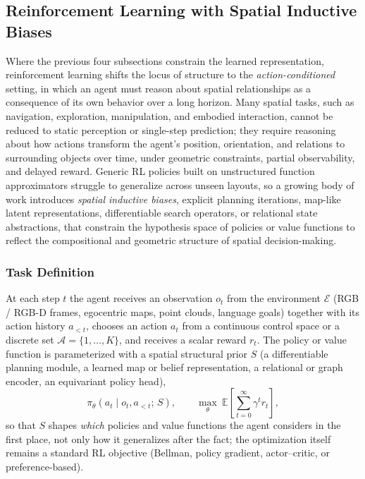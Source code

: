 \subsection{Reinforcement Learning with Spatial Inductive Biases}
\label{subsec:p3_s7_2_5}

Where the previous four subsections constrain the learned representation, reinforcement learning shifts the locus of structure to the \emph{action-conditioned} setting, in which an agent must reason about spatial relationships as a consequence of its own behavior over a long horizon.
Many spatial tasks, such as navigation, exploration, manipulation, and embodied interaction, cannot be reduced to static perception or single-step prediction; they require reasoning about how actions transform the agent's position, orientation, and relations to surrounding objects over time, under geometric constraints, partial observability, and delayed reward.
Generic RL policies built on unstructured function approximators struggle to generalize across unseen layouts, so a growing body of work introduces \emph{spatial inductive biases}, explicit planning iterations, map-like latent representations, differentiable search operators, or relational state abstractions, that constrain the hypothesis space of policies or value functions to reflect the compositional and geometric structure of spatial decision-making.


\subsubsection{Task Definition}
At each step $t$ the agent receives an observation $o_t$ from the environment $\mathcal{E}$ (RGB / RGB-D frames, egocentric maps, point clouds, language goals) together with its action history $a_{<t}$, chooses an action $a_t$ from a continuous control space or a discrete set $\mathcal{A}=\{1,\ldots,K\}$, and receives a scalar reward $r_t$.
The policy or value function is parameterized with a spatial structural prior $S$ (a differentiable planning module, a learned map or belief representation, a relational or graph encoder, an equivariant policy head),
\begin{equation}
  \pi_\theta(a_t \mid o_t, a_{<t};\, S),\qquad
  \max_\theta\ \mathbb{E}\!\left[\sum_{t=0}^{\infty} \gamma^t r_t\right],
\end{equation}
so that $S$ shapes \emph{which} policies and value functions the agent considers in the first place, not only how it generalizes after the fact; the optimization itself remains a standard RL objective (Bellman, policy gradient, actor--critic, or preference-based).

